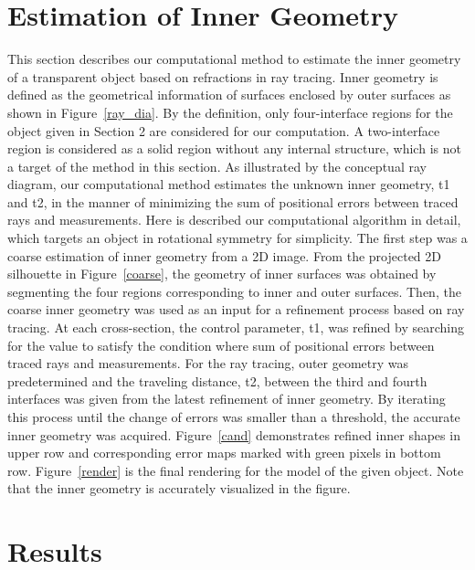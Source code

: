 \documentclass[10pt,twocolumn,letterpaper]{article}
\begin{document}
\section{Estimation of Inner Geometry}
This section describes our computational method to estimate the inner geometry of a transparent object based on refractions in ray tracing. Inner geometry is defined as the geometrical information of surfaces enclosed by outer surfaces as shown in Figure~\ref{ray_dia}. By the definition, only four-interface regions for the object given in Section 2 are considered for our computation. A two-interface region is considered as a solid region without any internal structure, which is not a target of the method in this section. As illustrated by the conceptual ray diagram, our computational method estimates the unknown inner geometry, t1 and t2, in the manner of minimizing the sum of positional errors between traced rays and measurements. Here is described our computational algorithm in detail, which targets an object in rotational symmetry for simplicity. 
The first step was a coarse estimation of inner geometry from a 2D image. From the projected 2D silhouette in Figure~\ref{coarse}, the geometry of inner surfaces was obtained by segmenting the four regions corresponding to inner and outer surfaces. Then, the coarse inner geometry was used as an input for a refinement process based on ray tracing. At each cross-section, the control parameter, t1, was refined by searching for the value to satisfy the condition where sum of positional errors between traced rays and measurements. For the ray tracing, outer geometry was predetermined and the traveling distance, t2, between the third and fourth interfaces was given from the latest refinement of inner geometry. By iterating this process until the change of errors was smaller than a threshold, the accurate inner geometry was acquired. Figure~\ref{cand} demonstrates refined inner shapes in upper row and corresponding error maps marked with green pixels in bottom row. Figure~\ref{render} is the final rendering for the model of the given object. Note that the inner geometry is accurately visualized in the figure. 

\section{Results}
\end{document}
